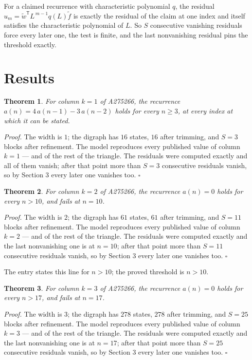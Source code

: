 \documentclass[11pt]{article}
\newtheorem{theorem}{Theorem}
\theoremstyle{definition}
\begin{document}
For a claimed recurrence with characteristic polynomial $q$, the residual $u_m = \tilde w^{\mathsf T}L^{\,m-1}q(L)\tilde f$ is exactly the residual of the claim at one index and itself satisfies the characteristic polynomial of $L$. So $S$ consecutive vanishing residuals force every later one, the test is finite, and the last nonvanishing residual pins the threshold exactly.

\section{Results}

\begin{theorem} For column $k = 1$ of A275266, the recurrence $a(n) = 4\,a(n-1) - 3\,a(n-2)$ holds for every $n \ge 3$, at every index at which it can be stated.\end{theorem}

{\itshape Proof.} The width is $1$; the digraph has $16$ states, $16$ after trimming, and $S = 3$ blocks after refinement. The model reproduces every published value of column $k = 1$ --- and of the rest of the triangle. The residuals were computed exactly and all of them vanish; after that point more than $S = 3$ consecutive residuals vanish, so by Section 3 every later one vanishes too. $\square$

\begin{theorem} For column $k = 2$ of A275266, the recurrence $a(n) = 0$ holds for every $n > 10$, and fails at $n = 10$.\end{theorem}

{\itshape Proof.} The width is $2$; the digraph has $61$ states, $61$ after trimming, and $S = 11$ blocks after refinement. The model reproduces every published value of column $k = 2$ --- and of the rest of the triangle. The residuals were computed exactly and the last nonvanishing one is at $n = 10$; after that point more than $S = 11$ consecutive residuals vanish, so by Section 3 every later one vanishes too. $\square$

The entry states this line for $n > 10$; the proved threshold is $n > 10$.

\begin{theorem} For column $k = 3$ of A275266, the recurrence $a(n) = 0$ holds for every $n > 17$, and fails at $n = 17$.\end{theorem}

{\itshape Proof.} The width is $3$; the digraph has $278$ states, $278$ after trimming, and $S = 25$ blocks after refinement. The model reproduces every published value of column $k = 3$ --- and of the rest of the triangle. The residuals were computed exactly and the last nonvanishing one is at $n = 17$; after that point more than $S = 25$ consecutive residuals vanish, so by Section 3 every later one vanishes too. $\square$
\end{document}
